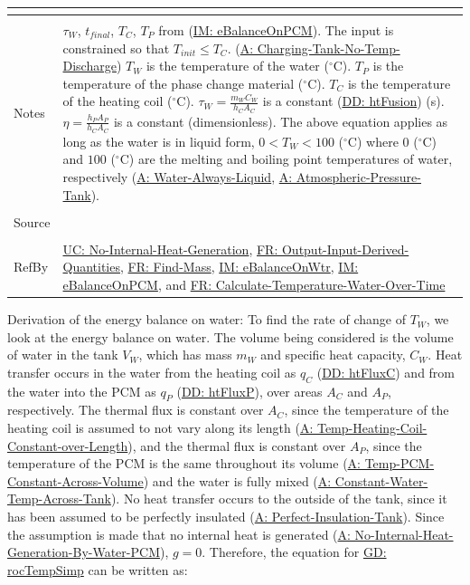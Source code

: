 \documentclass[12pt]{article}
\begin{document}
\begin{minipage}{\textwidth}
\begin{tabular}{>{\raggedright}p{}>{\raggedright\arraybackslash}p{}}
\begin{symbDescription}
              \end{symbDescription}
\\ \midrule \\
Notes & ${τ_{W}}$, ${t_{final}}$, ${T_{C}}$, ${T_{P}}$ from (\hyperref[IM:eBalanceOnPCM]{IM: eBalanceOnPCM}). The input is constrained so that ${T_{init}}\leq{}{T_{C}}$. (\hyperref[assumpCTNOD]{A: Charging-Tank-No-Temp-Discharge}) ${T_{W}}$ is the temperature of the water (${}^{\circ}$C). ${T_{P}}$ is the temperature of the phase change material (${}^{\circ}$C). ${T_{C}}$ is the temperature of the heating coil (${}^{\circ}$C). ${τ_{W}}=\frac{{m_{W}} {C_{W}}}{{h_{C}} {A_{C}}}$ is a constant (\hyperref[DD:htFusion]{DD: htFusion}) (s). $η=\frac{{h_{P}} {A_{P}}}{{h_{C}} {A_{C}}}$ is a constant (dimensionless). The above equation applies as long as the water is in liquid form, $0<{T_{W}}<100$ (${}^{\circ}$C) where $0$ (${}^{\circ}$C) and $100$ (${}^{\circ}$C) are the melting and boiling point temperatures of water, respectively (\hyperref[assumpWAL]{A: Water-Always-Liquid}, \hyperref[assumpAPT]{A: Atmospheric-Pressure-Tank}).
\\ \midrule \\
Source & \cite{koothoor2013}
\\ \midrule \\
RefBy & \hyperref[unlikeChgNIHG]{UC: No-Internal-Heat-Generation}, \hyperref[outputInputDerivQuants]{FR: Output-Input-Derived-Quantities}, \hyperref[findMass]{FR: Find-Mass}, \hyperref[IM:eBalanceOnWtr]{IM: eBalanceOnWtr}, \hyperref[IM:eBalanceOnPCM]{IM: eBalanceOnPCM}, and \hyperref[calcTempWtrOverTime]{FR: Calculate-Temperature-Water-Over-Time}
\\ \bottomrule
\end{tabular}
\end{minipage}
Derivation of the energy balance on water:
To find the rate of change of ${T_{W}}$, we look at the energy balance on water. The volume being considered is the volume of water in the tank ${V_{W}}$, which has mass ${m_{W}}$ and specific heat capacity, ${C_{W}}$. Heat transfer occurs in the water from the heating coil as ${q_{C}}$ (\hyperref[DD:htFluxC]{DD: htFluxC})  and from the water into the PCM as ${q_{P}}$ (\hyperref[DD:htFluxP]{DD: htFluxP}), over areas ${A_{C}}$ and ${A_{P}}$, respectively. The thermal flux is constant over ${A_{C}}$, since the temperature of the heating coil is assumed to not vary along its length (\hyperref[assumpTHCCoL]{A: Temp-Heating-Coil-Constant-over-Length}), and the thermal flux is constant over ${A_{P}}$, since the temperature of the PCM is the same throughout its volume (\hyperref[assumpTPCAV]{A: Temp-PCM-Constant-Across-Volume}) and the water is fully mixed (\hyperref[assumpCWTAT]{A: Constant-Water-Temp-Across-Tank}). No heat transfer occurs to the outside of the tank, since it has been assumed to be perfectly insulated (\hyperref[assumpPIT]{A: Perfect-Insulation-Tank}). Since the assumption is made that no internal heat is generated (\hyperref[assumpNIHGBWP]{A: No-Internal-Heat-Generation-By-Water-PCM}), $g=0$. Therefore, the equation for \hyperref[GD:rocTempSimp]{GD: rocTempSimp} can be written as:
\end{document}
